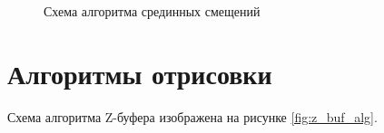 \begin{figure}[ph!]
	\caption{Схема алгоритма срединных смещений}
	\label{fig:brown_mov_alg}
\end{figure}

\clearpage

\section{Алгоритмы отрисовки}

Схема алгоритма Z-буфера изображена на рисунке \ref{fig:z_buf_alg}.

